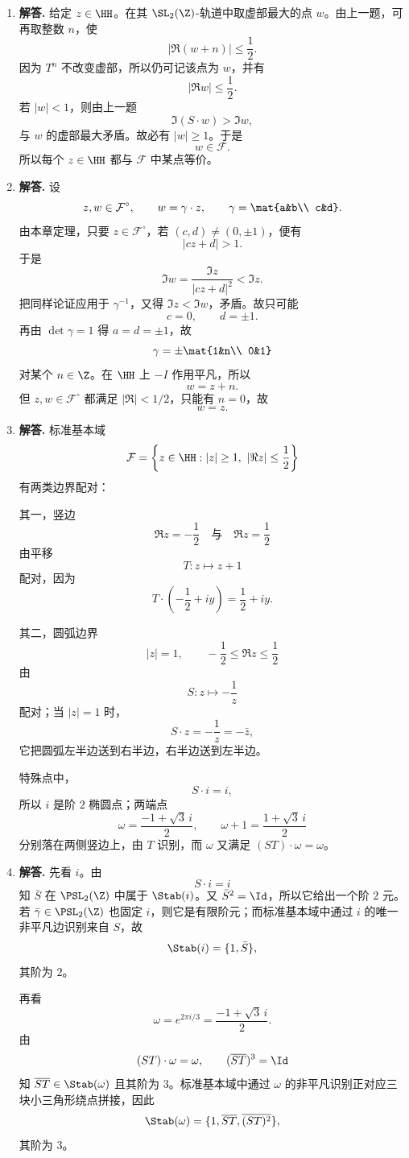 \begin{enumerate}[label=\textbf{\arabic*.}, leftmargin=*, itemsep=1em]
\item \textbf{解答.} 给定 $z\in\HH$。在其 $\SL_2(\Z)$-轨道中取虚部最大的点 $w$。由上一题，可再取整数 $n$，使
\[
|\Re(w+n)|\le \frac12.
\]
因为 $T^n$ 不改变虚部，所以仍可记该点为 $w$，并有
\[
|\Re w|\le \frac12.
\]
若 $|w|<1$，则由上一题
\[
\Im(S\cdot w)>\Im w,
\]
与 $w$ 的虚部最大矛盾。故必有 $|w|\ge 1$。于是
\[
w\in\mathcal F.
\]
所以每个 $z\in\HH$ 都与 $\mathcal F$ 中某点等价。

\item \textbf{解答.} 设
\[
z,w\in\mathcal F^\circ,\qquad w=\gamma\cdot z,\qquad \gamma=\mat{a&b\\ c&d}.
\]
由本章定理，只要 $z\in\mathcal F^\circ$，若 $(c,d)\neq(0,\pm1)$，便有
\[
|cz+d|>1.
\]
于是
\[
\Im w=\frac{\Im z}{|cz+d|^2}<\Im z.
\]
把同样论证应用于 $\gamma^{-1}$，又得 $\Im z<\Im w$，矛盾。故只可能
\[
c=0,\qquad d=\pm1.
\]
再由 $\det\gamma=1$ 得 $a=d=\pm1$，故
\[
\gamma=\pm\mat{1&n\\ 0&1}
\]
对某个 $n\in\Z$。在 $\HH$ 上 $-I$ 作用平凡，所以
\[
w=z+n.
\]
但 $z,w\in\mathcal F^\circ$ 都满足 $|\Re|<1/2$，只能有 $n=0$，故
\[
w=z.
\]

\item \textbf{解答.} 标准基本域
\[
\mathcal F=\left\{z\in\HH:|z|\ge1,\ |\Re z|\le \frac12\right\}
\]
有两类边界配对：

其一，竖边
\[
\Re z=-\frac12\quad\text{与}\quad \Re z=\frac12
\]
由平移
\[
T:z\mapsto z+1
\]
配对，因为
\[
T\cdot\left(-\frac12+iy\right)=\frac12+iy.
\]

其二，圆弧边界
\[
|z|=1,\qquad -\frac12\le \Re z\le \frac12
\]
由
\[
S:z\mapsto -\frac1z
\]
配对；当 $|z|=1$ 时，
\[
S\cdot z=-\frac1z=-\bar z,
\]
它把圆弧左半边送到右半边，右半边送到左半边。

特殊点中，
\[
S\cdot i=i,
\]
所以 $i$ 是阶 $2$ 椭圆点；两端点
\[
\omega=\frac{-1+\sqrt3\,i}{2},\qquad \omega+1=\frac{1+\sqrt3\,i}{2}
\]
分别落在两侧竖边上，由 $T$ 识别，而 $\omega$ 又满足 $(ST)\cdot\omega=\omega$。

\item \textbf{解答.} 先看 $i$。由
\[
S\cdot i=i
\]
知 $\bar S$ 在 $\PSL_2(\Z)$ 中属于 $\Stab(i)$。又 $\bar S^2=\Id$，所以它给出一个阶 $2$ 元。若 $\bar\gamma\in\PSL_2(\Z)$ 也固定 $i$，则它是有限阶元；而标准基本域中通过 $i$ 的唯一非平凡边识别来自 $S$，故
\[
\Stab(i)=\{1,\bar S\},
\]
其阶为 $2$。

再看
\[
\omega=e^{2\pi i/3}=\frac{-1+\sqrt3\,i}{2}.
\]
由
\[
(ST)\cdot\omega=\omega,\qquad (\overline{ST})^3=\Id
\]
知 $\overline{ST}\in\Stab(\omega)$ 且其阶为 $3$。标准基本域中通过 $\omega$ 的非平凡识别正对应三块小三角形绕点拼接，因此
\[
\Stab(\omega)=\{1,\overline{ST},\overline{(ST)^2}\},
\]
其阶为 $3$。


\end{enumerate}
